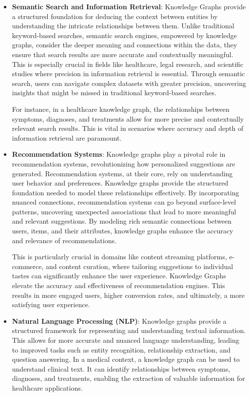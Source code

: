 \begin{itemize}
    \item \textbf{Semantic Search and Information Retrieval}:
    Knowledge Graphs provide a structured foundation for deducing the context between entities by understanding the intricate relationships between them. Unlike traditional keyword-based searches, semantic search engines, empowered by knowledge graphs, consider the deeper meaning and connections within the data, they ensure that search results are more accurate and contextually meaningful. This is especially crucial in fields like healthcare, legal research, and scientific studies where precision in information retrieval is essential. Through semantic search, users can navigate complex datasets with greater precision, uncovering insights that might be missed in traditional keyword-based searches.

    For instance, in a healthcare knowledge graph, the relationships between symptoms, diagnoses, and treatments allow for more precise and contextually relevant search results. This is vital in scenarios where accuracy and depth of information retrieval are paramount.

    
    \item \textbf{Recommendation Systems}:
    Knowledge graphs play a pivotal role in recommendation systems, revolutionizing how personalized suggestions are generated. 
    Recommendation systems, at their core, rely on understanding user behavior and preferences. Knowledge graphs provide the structured foundation needed to model these relationships effectively. By incorporating nuanced connections, recommendation systems can go beyond surface-level patterns, uncovering unexpected associations that lead to more meaningful and relevant suggestions.
    By modeling rich semantic connections between users, items, and their attributes, knowledge graphs enhance the accuracy and relevance of recommendations. 
    
    This is particularly crucial in domains like content streaming platforms, e-commerce, and content curation, where tailoring suggestions to individual tastes can significantly enhance the user experience. Knowledge Graphs elevate the accuracy and effectiveness of recommendation engines. This results in more engaged users, higher conversion rates, and ultimately, a more satisfying user experience.


    \item \textbf{Natural Language Processing (NLP)}:
    Knowledge graphs provide a structured framework for representing and understanding textual information. This allows for more accurate and nuanced language understanding, leading to improved tasks such as entity recognition, relationship extraction, and question answering. In a medical context, a knowledge graph can be used to understand clinical text. It can identify relationships between symptoms, diagnoses, and treatments, enabling the extraction of valuable information for healthcare applications.


\end{itemize}
